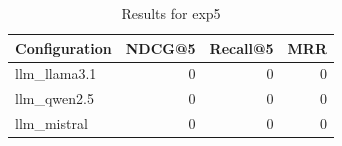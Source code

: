 \begin{table}[htbp]
  \centering
  \caption{Results for exp5}
  \label{tab:exp5}
  \begin{tabular}{lrrr}
    \toprule
    Configuration & NDCG@5 & Recall@5 & MRR \\
    \midrule
    llm_llama3.1 & 0 & 0 & 0 \\
    llm_qwen2.5 & 0 & 0 & 0 \\
    llm_mistral & 0 & 0 & 0 \\
    \bottomrule
  \end{tabular}
\end{table}